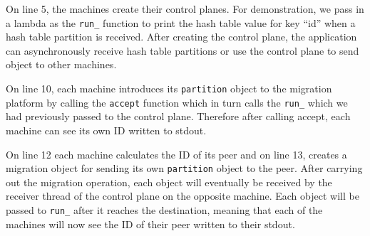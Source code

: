 On line 5, the machines create their
control planes. For demonstration, we pass in a lambda as the \texttt{run\_}
function to print the hash table value for key ``id'' when a hash table
partition is received. After creating the control plane, the application can
asynchronously receive hash table partitions or use the control plane to
send object to other machines.

On line 10, each machine introduces its \texttt{partition} object to the
migration platform by calling the \texttt{accept} function which in turn calls
the \texttt{run\_} which we had previously passed to the control plane. Therefore
after calling accept, each machine can see its own ID written to stdout.

On line 12 each machine calculates the ID of its peer and on line 13, creates
a migration object for sending
its own \texttt{partition} object to the peer. After carrying out the migration
operation, each object will eventually be
received by the receiver thread of the control plane on the opposite machine.
Each object will be passed to \texttt{run\_} after it reaches the destination,
meaning that each of the machines will now see the ID of their peer written
to their stdout.
